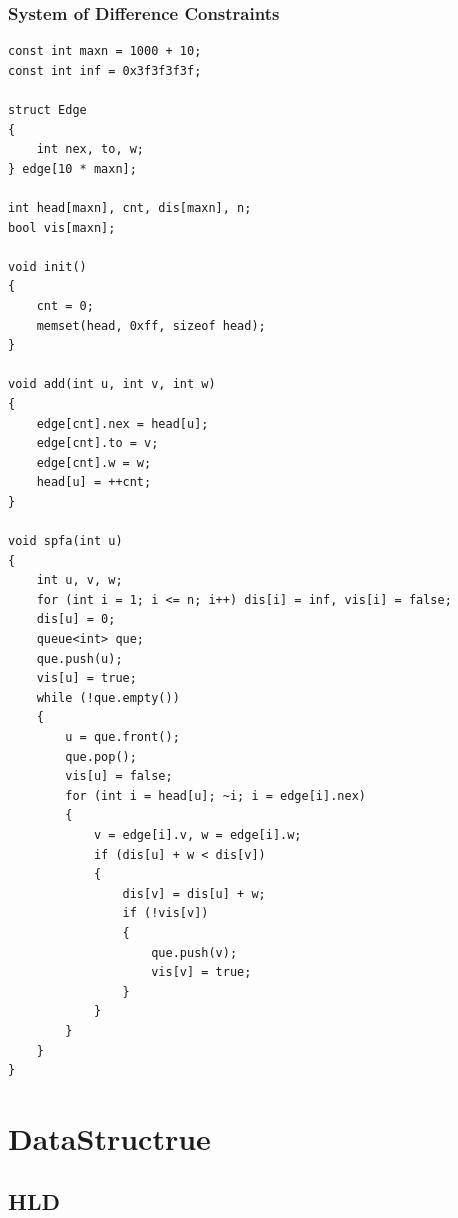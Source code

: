 \documentclass[twoside]{article}
\begin{document}
\subsubsection{System of Difference Constraints}
\begin{lstlisting}
const int maxn = 1000 + 10;
const int inf = 0x3f3f3f3f;

struct Edge
{
    int nex, to, w;
} edge[10 * maxn];

int head[maxn], cnt, dis[maxn], n;
bool vis[maxn];

void init()
{
    cnt = 0;
    memset(head, 0xff, sizeof head);
}

void add(int u, int v, int w)
{
    edge[cnt].nex = head[u];
    edge[cnt].to = v;
    edge[cnt].w = w;
    head[u] = ++cnt;
}

void spfa(int u)
{
    int u, v, w;
    for (int i = 1; i <= n; i++) dis[i] = inf, vis[i] = false;
    dis[u] = 0;
    queue<int> que;
    que.push(u);
    vis[u] = true;
    while (!que.empty())
    {
        u = que.front();
        que.pop();
        vis[u] = false;
        for (int i = head[u]; ~i; i = edge[i].nex)
        {
            v = edge[i].v, w = edge[i].w;
            if (dis[u] + w < dis[v])
            {
                dis[v] = dis[u] + w;
                if (!vis[v])
                {
                    que.push(v);
                    vis[v] = true;
                }
            }
        }
    }
}\end{lstlisting}
\clearpage\section{DataStructrue}
\subsection{HLD}
\end{document}
